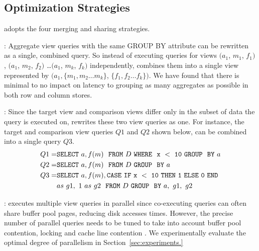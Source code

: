 \subsection{Optimization Strategies}

 \SeeDB adopts the four merging and sharing strategies.

: Aggregate view queries 
with the same GROUP BY attribute can be 
rewritten as a single, combined query. So instead of executing
queries for views $(a_1$, $m_1$, $f_1)$, $(a_1$, $m_2$, $f_2)$ \ldots $(a_1$, $m_k$, $f_k)$
independently, \SeeDB combines them into a single view represented by
$(a_1, \{m_1, m_2\ldots m_k\}$, $\{f_1, f_2\ldots f_k\})$.  
We have found that there is minimal to no impact on latency 
to grouping as many aggregates as possible in both row and column stores. 

:
Since the target view and comparison views differ only in the subset of data
 the query is executed on, \SeeDB rewrites these two view queries as
one. For instance, the target and comparison view queries $Q1$ and $Q2$
shown below, can be combined into a single query $Q3$.
\vspace{-5pt}
\begin{align*} 
Q1 = &{\tt SELECT \ } a, f(m) \ \ {\tt FROM} \  D\  {\tt WHERE \ \ x\ <\ 10\
GROUP \ \ BY} \ a \\
Q2 = &{\tt SELECT \ } a, f(m) \ \ {\tt FROM} \  D\  {\tt GROUP \ \ BY} \ a \\
Q3 = &{\tt SELECT \ } a, f(m), {\tt CASE\ IF\ x\ <\ 10\ THEN\ 1\ ELSE\ 0\
END}\\ 
&as\ g1,\ 1\ as\ g2 \ \ {\tt FROM} \ D\ {\tt GROUP \ \ BY} \ a,\ g1,\ g2
\end{align*}

:
  \SeeDB executes multiple view queries in parallel since  co-executing queries can often
 share buffer pool pages, reducing disk accesses times. 
  However, the precise number of parallel queries needs to be tuned to take into account 
  buffer pool contention, locking and cache line contention \cite{Postgres_wiki}.  We experimentally
evaluate the optimal degree of parallelism in Section~\ref{sec:experiments.}

